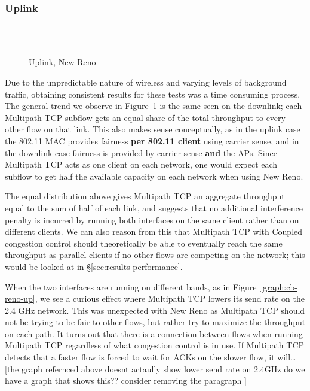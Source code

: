 \subsubsection{Uplink}
\label{sec:results-mptcp-up}

\begin{figure}[h]
  \centering
  \\
  \subfloat[][2.4 GHz, non-overlapping channels] {\
    \scalebox{0.70}{}\label{graph:cc-reno-up}
  }
  \\
  \subfloat[][5 and 2.4 GHz] {\
    \scalebox{0.70}{}\label{graph:cb-reno-up}
  }
  \caption{Uplink, New Reno}\label{graph:reno-up}
\end{figure}

Due to the unpredictable nature of wireless and varying levels of background
traffic, obtaining consistent results for these tests was a time consuming
process. The general trend we observe in Figure~\ref{graph:reno-up} is the
same seen on the downlink; each Multipath TCP subflow gets an equal
share of the total throughput to every other flow on that link. This also makes
sense conceptually, as in the uplink case the 802.11 MAC provides fairness
\textbf{per 802.11 client} using carrier sense, and in the downlink case
fairness is provided by carrier sense \textbf{and} the APs. Since Multipath TCP
acts as one client on each network, one would expect each subflow to get half
the available capacity on each network when using New Reno.

The equal distribution above gives Multipath TCP an aggregate throughput equal
to the sum of half of each link, and suggests that no additional interference
penalty is incurred by running both interfaces on the same client rather than on
different clients. We can also reason from this that Multipath TCP with Coupled
congestion control should theoretically be able to eventually reach the same
throughput as parallel clients if no other flows are competing on the network; 
this would be looked at in \S\ref{sec:results-performance}.

When the two interfaces are running on different bands, as in
Figure~\ref{graph:cb-reno-up}, we see a curious effect where Multipath TCP
lowers its send rate on the 2.4 GHz network. This was unexpected with New Reno
as Multipath TCP should not be trying to be fair to other flows, but rather try
to maximize the throughput on each path. It turns out that there is a connection
between flows when running Multipath TCP regardless of what congestion control
is in use. If Multipath TCP detects that a faster flow is forced to wait for
ACKs on the slower flow, it will…
[the graph refernced above doesnt actaully show lower send rate on 2.4GHz
do we have a graph that shows this?? consider removing the paragraph ]
